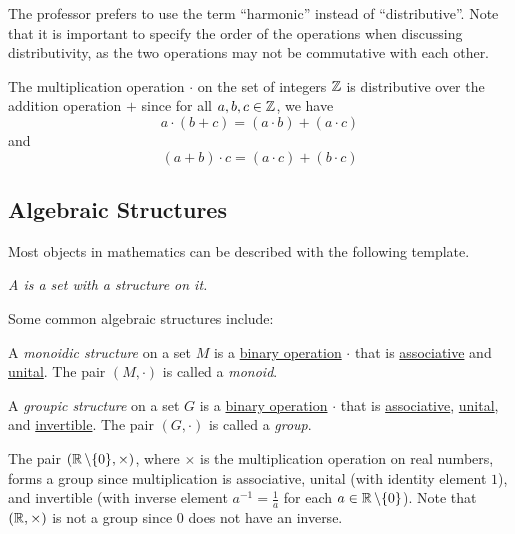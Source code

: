 The professor prefers to use the term ``harmonic'' instead of ``distributive''. Note that it is important to specify the order of the operations when discussing distributivity, as the two operations may not be commutative with each other.

\begin{example}
  The multiplication operation $\cdot$ on the set of integers $\operatorname{\mathbb{Z}}$ is distributive over the addition operation $+$ since for all $a, b, c \in \operatorname{\mathbb{Z}}$, we have
  \[ a \cdot (b + c) = (a \cdot b) + (a \cdot c) \]
  and
  \[ (a + b) \cdot c = (a \cdot c) + (b \cdot c) \]
\end{example}

\subsection{Algebraic Structures}

Most objects in mathematics can be described with the following template.
\begin{center}
  \it A \underline{\hspace{3cm}} is a set with a \underline{\hspace{3cm}} structure on it.
\end{center}

Some common algebraic structures include:

\begin{definition}\label{def:monoidic_structure}
  A \emph{monoidic structure} on a set $M$ is a \hyperref[def:binary_operation]{binary operation} $\cdot$ that is \hyperref[def:associative]{associative} and \hyperref[def:unital]{unital}. The pair $(M, \cdot)$ is called a \emph{monoid}.
\end{definition}

\begin{definition}\label{def:groupic_structure}
  A \emph{groupic structure} on a set $G$ is a \hyperref[def:binary_operation]{binary operation} $\cdot$ that is \hyperref[def:associative]{associative}, \hyperref[def:unital]{unital}, and \hyperref[def:invertible]{invertible}. The pair $(G, \cdot)$ is called a \emph{group}.
\end{definition}

\begin{example}
  The pair $(\operatorname{\mathbb{R}} \setminus \{ 0 \}, \times)$, where $\times$ is the multiplication operation on real numbers, forms a group since multiplication is associative, unital (with identity element $1$), and invertible (with inverse element $a^{-1} = \frac{1}{a}$ for each $a \in \operatorname{\mathbb{R}} \setminus \{ 0 \}$). Note that $(\operatorname{\mathbb{R}}, \times)$ is not a group since $0$ does not have an inverse.
\end{example}

